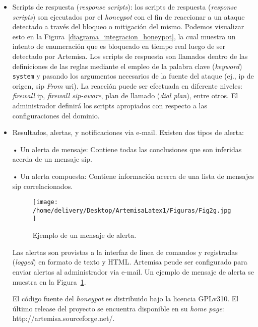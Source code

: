 \documentclass[a4paper,12pt]{report}
\begin{document}
\begin{itemize}
\begin{verbatim}
[rule_4]
type = Correlation.ThresholdInWindow
context = INVITE
scope = IPSrc
timer = 1
threshold = 3
action = system "bash ./on_flood.sh %IPSrc"
\end{verbatim}

\item Scripts de respuesta (\emph{response scripts}):
los scripts de respuesta (\emph{response scripts}) son ejecutados por el
\emph{honeypot} con el fin de reaccionar a un ataque detectado a través del bloqueo o
mitigación del mismo. Podemos visualizar esto en la Figura~\ref{diagrama_integracion_honeypot}, 
la cual muestra un intento de enumeración que es bloqueado en tiempo real luego de ser detectado por
Artemisa. Los scripts de respuesta son llamados dentro de las definiciones de
las reglas mediante el empleo de la palabra clave
(\emph{keyword}) \texttt{system} y pasando los argumentos necesarios de la
fuente del ataque (ej., \ac{ip} de origen, \ac{sip} \emph{From} \ac{uri}). La reacción puede ser
efectuada en diferente niveles: \emph{firewall} \ac{ip}, \emph{firewall \ac{sip}-aware}, plan de
llamado (\emph{\mbox{dial} \mbox{plan}}), entre otros. El administrador definirá los scripts
apropiados con respecto a las configuraciones del dominio. 

\item Resultados, alertas, y notificaciones via e-mail. Existen dos tipos de alerta: 

• Un alerta de mensaje: Contiene todas las conclusiones que son inferidas acerda
de un mensaje \ac{sip}.

• Un alerta compuesta: Contiene información acerca de una lista de mensajes \ac{sip}
correlacionados. 

\begin{figure}[h!] 
\centering
\texttt{[image: /home/delivery/Desktop/ArtemisaLatex1/Figuras/Fig2g.jpg]}
\caption{Ejemplo de un mensaje de alerta. \cite{docarmof}}
\label{ej_mje_alerta}
\end{figure}

Las alertas son provistas a la interfaz de linea de comandos y registradas 
(\emph{logged}) en formato de texto y HTML. Artemisa peude ser
configurado para enviar alertas al ad\-mi\-nis\-tra\-dor via e-mail. Un ejemplo de
mensaje de alerta se muestra en la Figura~\ref{ej_mje_alerta}.

El código fuente del \emph{honeypot} es distribuido bajo la licencia GPLv310. El
último release del proyecto se encuentra disponible en su \emph{home page}:
http://artemisa.sourceforge.net/.               

\end{itemize}                   
\end{document}
